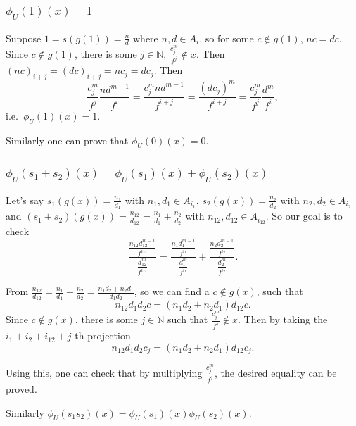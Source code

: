 \documentclass[11pt]{article}
\begin{document}
    \hypertarget{phi_u1x1}{%
\subsubsection{\texorpdfstring{\(\phi_U(1)(x)=1\)}{\textbackslash phi\_U(1)(x)=1}}\label{phi_u1x1}}

Suppose \(1=s(g(1))=\frac n d\) where \(n,d\in A_i\), so for some
\(c\not\in g(1)\), \(nc=dc\). Since \(c\not\in g(1)\), there is some
\(j\in\mathbb N\), \(\frac{c_j^m}{f^j}\not\in x\). Then
\((nc)_{i+j}=(dc)_{i+j}=nc_j=dc_j\). Then \[
\frac{c_j^m}{f^j}\frac{nd^{m-1}}{f^i}=\frac{c_j^mnd^{m-1}}{f^{i+j}}=\frac{(dc_j)^m}{f^{i+j}}=\frac{c_j^m}{f^j}\frac{d^m}{f^i},
\] i.e.~\(\phi_U(1)(x)=1\).

Similarly one can prove that \(\phi_U(0)(x)=0\).

    \hypertarget{phi_us_1s_2xphi_us_1xphi_us_2x}{%
\subsubsection{\texorpdfstring{\(\phi_U(s_1+s_2)(x)=\phi_U(s_1)(x)+\phi_U(s_2)(x)\)}{\textbackslash phi\_U(s\_1+s\_2)(x)=\textbackslash phi\_U(s\_1)(x)+\textbackslash phi\_U(s\_2)(x)}}\label{phi_us_1s_2xphi_us_1xphi_us_2x}}

Let's say \(s_1(g(x))=\frac{n_1}{d_1}\) with \(n_1,d_1\in A_{i_1}\),
\(s_2(g(x))=\frac{n_2}{d_2}\) with \(n_2, d_2\in A_{i_2}\) and
\((s_1+s_2)(g(x))=\frac{n_{12}}{d_{12}}=\frac{n_1}{d_1}+\frac{n_2}{d_2}\)
with \(n_{12}, d_{12}\in A_{i_{12}}\). So our goal is to check
\begin{equation}
\frac{\frac{n_{12}d_{12}^{m-1}}{f^{i_{12}}}}{\frac{d_{12}^m}{f^{i_{12}}}}=\frac{\frac{n_1d_1^{m-1}}{f^{i_1}}}{\frac{d_1^m}{f^{i_1}}} + \frac{\frac{n_2d_2^{m-1}}{f^{i_2}}}{\frac{d_2^m}{f^{i_2}}}.
\end{equation}


From
\(\frac{n_{12}}{d_{12}}=\frac{n_1}{d_1}+\frac{n_2}{d_2}=\frac{n_1d_2+n_2d_1}{d_1d_2}\),
so we can find a \(c\not\in g(x)\), such that \[
n_{12}d_1d_2c=(n_1d_2+n_2d_1)d_{12}c.
\] Since \(c\not\in g(x)\), there is some \(j\in\mathbb N\) such that
\(\frac{c_j^m}{f^j}\not\in x\). Then by taking the
\(i_1+i_2+i_{12}+j\)-th projection \[
n_{12}d_1d_2c_j=(n_1d_2+n_2d_1)d_{12}c_j.
\]

Using this, one can check that by multiplying \(\frac{c_j^m}{f^j}\), the
desired equality can be proved.

Similarly \(\phi_U(s_1s_2)(x)=\phi_U(s_1)(x)\phi_U(s_2)(x)\).
\end{document}
